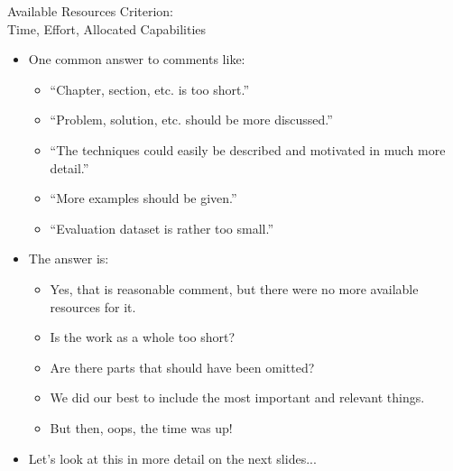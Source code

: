 \documentclass[xcolor=dvipsnames]{beamer}
\begin{document}
\begin{frame}{Available Resources Criterion:\\Time, Effort, Allocated Capabilities}
\label{resources}
\begin{itemize}
	\item One common answer to comments like:	
	\begin{itemize}
		\item ``Chapter, section, etc. is too short.''
		\item ``Problem, solution, etc. should be more discussed.''
		\item ``The techniques could easily be described and motivated in much more detail.''
		\item ``More examples should be given.''
		\item ``Evaluation dataset is rather too small.''
	\end{itemize}
	

	\item The answer is:		
	\begin{itemize}
		\item Yes, that is reasonable comment, but there were no more available resources for it.
		\item Is the work as a whole too short?
		\item Are there parts that should have been omitted?
		\medskip
		\item We did our best to include the most important and relevant things.
		\item But then, oops, the time was up! 
	\end{itemize}

	\item Let's look at this in more detail on the next slides...		
\end{itemize}
\end{frame}
\end{document}
